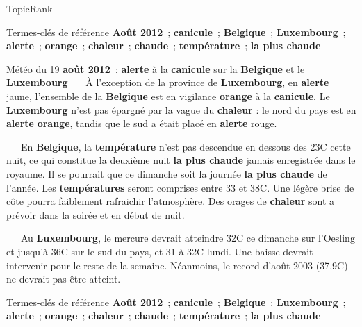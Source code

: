 \begin{frame}{TopicRank}
{\begin{exampleblock}
      \begin{exampleblock}{\small Termes-clés de référence}\justifying\small
        \textbf{Août 2012}~; \textbf{canicule}~;
        \textbf{Belgique}~; \textbf{Luxembourg}~; \textbf{alerte}~;
        \textbf{orange}~; \textbf{chaleur}~; \textbf{chaude}~;
        \textbf{température}~; \textbf{la plus chaude}
      \end{exampleblock}
    \end{exampleblock}
  }{
    \begin{exampleblock}{\small
      Météo du 19 \textbf{août 2012}~: \textbf{alerte} à la
      \textbf{canicule} sur la \textbf{Belgique} et le
      \textbf{Luxembourg}
    }\justifying\small
      ~~~À l'exception de la province de \textbf{Luxembourg}, en
      \textbf{alerte} jaune, l'ensemble de la \textbf{Belgique} est en
      vigilance \textbf{orange} à la \textbf{canicule}. Le
      \textbf{Luxembourg} n'est pas épargné par la vague du \textbf{chaleur}
      : le nord du pays est en \textbf{alerte} \textbf{orange}, tandis que
      le sud a était placé en \textbf{alerte} rouge.

      ~~~En \textbf{Belgique}, la \textbf{température} n'est pas descendue
      en dessous des 23\degre{}C cette nuit, ce qui constitue la deuxième nuit
      \textbf{la plus chaude} jamais enregistrée dans le royaume. Il se
      pourrait que ce dimanche soit la journée \textbf{la plus chaude} de
      l'année. Les \textbf{températures} seront comprises entre 33 et
      38\degre{}C. Une légère brise de côte pourra faiblement rafraichir
      l'atmosphère. Des orages de \textbf{chaleur} sont a prévoir dans la
      soirée et en début de nuit.

      ~~~Au \textbf{Luxembourg}, le mercure devrait atteindre 32\degre{}C ce
      dimanche sur l'Oesling et jusqu'à 36\degre{}C sur le sud du pays, et 31 à
      32\degre{}C lundi. Une baisse devrait intervenir pour le reste de la
      semaine. Néanmoins, le record d'août 2003 (37,9\degre{}C) ne devrait pas
      être atteint.

      \begin{exampleblock}{\small Termes-clés de référence}\justifying\small
        \textbf{Août 2012}~; \textbf{canicule}~;
        \textbf{Belgique}~; \textbf{Luxembourg}~; \textbf{alerte}~;
        \textbf{orange}~; \textbf{chaleur}~; \textbf{chaude}~;
        \textbf{température}~; \textbf{la plus chaude}
      \end{exampleblock}
    \end{exampleblock}
  }
\end{frame}


